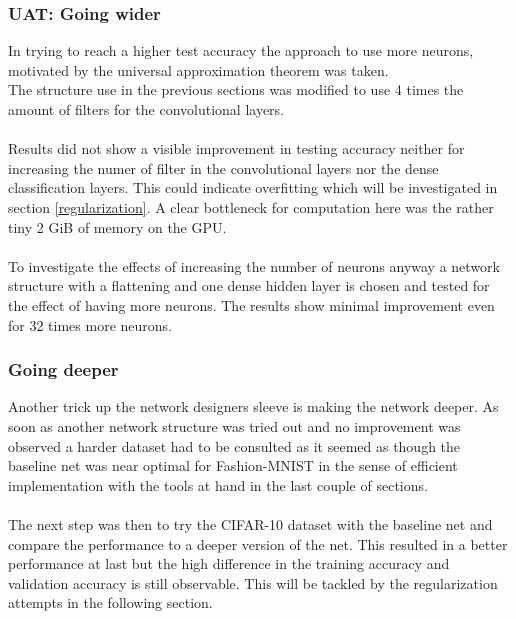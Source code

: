 \documentclass{article}
\begin{document}
\begin{multicols}{2}
\subsubsection{UAT: Going wider}
In trying to reach a higher test accuracy the approach to use more neurons, motivated by the universal approximation theorem was taken.\\
The structure use in the previous sections was modified to use 4 times the amount of filters for the convolutional layers.\\
\\
Results did not show a visible improvement in testing accuracy neither for increasing the numer of filter in the convolutional layers nor the dense classification layers. This could indicate overfitting which will be investigated in section \ref{regularization}. A clear bottleneck for computation here was the rather tiny 2 GiB of memory on the GPU.\\
\\
To investigate the effects of increasing the number of neurons anyway a network structure with a flattening and one dense hidden layer is chosen and tested for the effect of having more neurons. The results show minimal improvement even for 32 times more neurons.

\subsubsection{Going deeper}
Another trick up the network designers sleeve is making the network deeper. As soon as another network structure was tried out and no improvement was observed a harder dataset had to be consulted as it seemed as though the baseline net was near optimal for Fashion-MNIST in the sense of efficient implementation with the tools at hand in the last couple of sections.\\
\\
The next step was then to try the CIFAR-10 dataset with the baseline net and compare the performance to a deeper version of the net. This resulted in a better performance at last but the high difference in the training accuracy and validation accuracy is still observable. This will be tackled by the regularization attempts in the following section.


\end{multicols}
\end{document}
